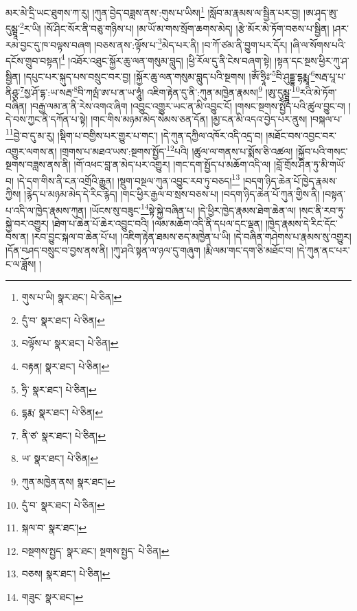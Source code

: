 མར་མེ་དྲི་ཡང་ཐུགས་ཀ་རུ། །ཀུན་བྱེད་བཟླས་ནས་:གུས་པ་ཡིས།\footnote{གུས་པ་ཡི།  སྣར་ཐང་།  པེ་ཅིན། } །སློབ་མ་རྣམས་ལ་སྦྱིན་པར་བྱ། །ཨ་ཤྭད་ཨུ་དུམྺཱ་\footnote{དུཾ་བ་  སྣར་ཐང་།  པེ་ཅིན། }ར་ཡི། །སོ་ཤིང་སོར་ནི་བཅུ་གཉིས་པ། །མ་ཡོ་མ་གས་སྲོག་ཆགས་མེད། །རྩེ་མོར་མེ་ཏོག་བཅས་པ་སྦྱིན། །ཤར་རམ་བྱང་དུ་ཁ་བལྟས་བཞག །བཅས་ནས་:ལྟོས་པ་\footnote{བལྟོས་པ་  སྣར་ཐང་།  པེ་ཅིན། }མེད་པར་ནི། །བ་ཀོ་ཙམ་ནི་བྱུག་པར་དོར། །ཞི་ལ་སོགས་པའི་དངོས་གྲུབ་བསྟན།\footnote{བརྟན།  སྣར་ཐང་།  པེ་ཅིན། } །འཐོར་འཐུང་སྐྱོར་ཆུ་ལན་གསུམ་བླུད། །ཕྱི་རོལ་དུ་ནི་ངེས་བཞག་སྟེ། །སྟན་དང་སྔས་ཕྱིར་ཀུ་ཤ་སྦྱིན། །དཔུང་པར་སྐུད་པས་བསྲུང་བར་བྱ། །སྐྱོར་ཆུ་ལན་གསུམ་བླུད་པའི་སྔགས། །ཨོཾ་ཧྲཱིཿ་\footnote{ཧྲི་  སྣར་ཐང་།  པེ་ཅིན། }བི་ཤུདྡྷ་དྷརྨྨཱ་\footnote{དྷརྨ་  སྣར་ཐང་།  པེ་ཅིན། }སརྦ་པཱ་པ་ནིཤྩ་\footnote{ནི་ཙ་  སྣར་ཐང་།  པེ་ཅིན། }སྱ་ཤོ་དྷ་:ཡ་སརྦ་\footnote{ཡ་  སྣར་ཐང་།  པེ་ཅིན། }བི་ཀལྤཾ་ཨ་པ་ན་ཡ་ཧཱུཾ། འཇིག་རྟེན་དུ་ནི་:ཀུན་མཁྱེན་རྣམས།\footnote{ཀུན་མཁྱེན་ནས།  སྣར་ཐང་། } །ཨུ་དུམྺཱ་\footnote{དུཾ་བ་  སྣར་ཐང་།  པེ་ཅིན། }རའི་མེ་ཏོག་བཞིན། །བརྒྱ་ལམ་ན་ནི་རེས་འགའ་ཞིག །འབྱུང་འགྱུར་ཡང་ན་མི་འབྱུང་ངོ། །གསང་སྔགས་སྤྱོད་པའི་ཚུལ་བྱུང་བ། །དེ་བས་ཀྱང་ནི་དཀོན་པ་སྟེ། །གང་གིས་མཉམ་མེད་སེམས་ཅན་དོན། །མྱ་ངན་མི་འདའ་བྱེད་པར་ནུས། །བསྐལ་པ་\footnote{སྐལ་བ་  སྣར་ཐང་། }བྱེ་བ་དུ་མ་རུ། །སྡིག་པ་བགྱིས་པར་གྱུར་པ་གང་། །དེ་ཀུན་དཀྱིལ་འཁོར་འདི་འདྲ་བ། །མཐོང་བས་འབྱང་བར་འགྱུར་ལགས་ན། །གྲགས་པ་མཐའ་ཡས་:སྔགས་སྤྱོད་\footnote{བསྔགས་སྤྱད་  སྣར་ཐང་། སྔགས་སྤྱད་  པེ་ཅིན། }པའི། །ཚུལ་ལ་གནས་པ་སྨོས་ཅི་འཚལ། །སྐྱོབ་པའི་གསང་སྔགས་བཟླས་ནས་ནི། །གོ་འཕང་བླ་ན་མེད་པར་འགྱུར། །གང་དག་སྤྱོད་པ་མཆོག་འདི་ལ། །བློ་གྲོས་ཤིན་ཏུ་མི་གཡོ་བ། །དེ་དག་གིས་ནི་ངན་འགྲོའི་རྒྱུན། །སྡུག་བསྔལ་ཀུན་འབྱུང་རབ་ཏུ་བཅད།\footnote{བཅས།  སྣར་ཐང་།  པེ་ཅིན། } །བདག་ཉིད་ཆེན་པོ་ཁྱེད་རྣམས་ཀྱིས། །རྙེད་པ་མཉམ་མེད་དེ་རིང་རྙེད། །གང་ཕྱིར་རྒྱལ་བ་སྲས་བཅས་པ། །བདག་ཉིད་ཆེན་པོ་ཀུན་གྱིས་ནི། །བསྟན་པ་འདི་ལ་ཁྱེད་རྣམས་ཀུན། །ཡོངས་སུ་བཟུང་\footnote{གཟུང་  སྣར་ཐང་། }སྟེ་སྐྱེ་བཞིན་པ། །དེ་ཕྱིར་ཁྱེད་རྣམས་ཐེག་ཆེན་ལ། །སང་ནི་རབ་ཏུ་སྐྱེ་བར་འགྱུར། །ཐེག་པ་ཆེན་པོ་ཆེར་འབྱུང་བའི། །ལམ་མཆོག་འདི་ནི་དཔལ་དང་ལྡན། །ཁྱེད་རྣམས་དེ་རིང་དོང་བས་ན། །རབ་བྱུང་སྐལ་བ་ཆེན་པོ་པ། །འཇིག་རྟེན་ཐམས་ཅད་མཁྱེན་པ་ཡི། །དེ་བཞིན་གཤེགས་པ་རྣམས་སུ་འགྱུར། །དོན་བཤད་བསྲུང་བ་བྱས་ནས་ནི། །ཀུ་ཤའི་སྟན་ལ་ཉལ་དུ་གཞུག །རྨི་ལམ་གང་དག་ཅི་མཐོང་བ། །དེ་ཀུན་ནང་པར་ང་ལ་ཟློས། །
